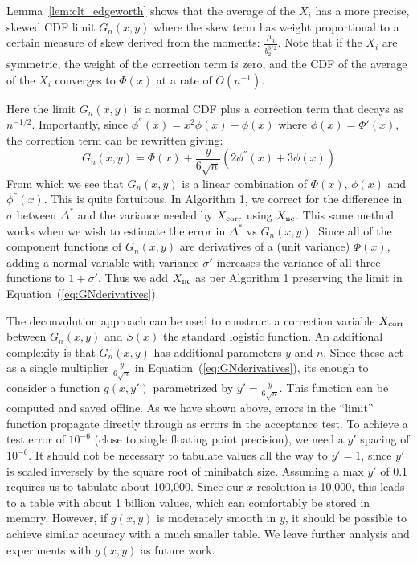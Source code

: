 \documentclass[twoside]{article} \usepackage{aistats2017}
\begin{document}
Lemma~\ref{lem:clt_edgeworth} shows that the average of the $X_i$ has a more
precise, skewed CDF limit $G_n(x,y)$ where the skew term has weight proportional
to a certain measure of skew derived from the moments:
$\frac{\mu_3}{b_2^{3/2}}$. Note that if the $X_i$ are symmetric, the weight of
the correction term is zero, and the CDF of the average of the $X_i$ converges
to $\Phi(x)$ at a rate of $O(n^{-1})$.

Here the limit $G_n(x,y)$ is a normal CDF plus a correction term that decays as
$n^{-1/2}$.
Importantly, since $\phi^{''}(x) = x^2\phi(x) - \phi(x)$ where
$\phi(x)=\Phi'(x)$, the correction term can be rewritten giving:
\begin{equation}\label{eq:GNderivatives}
    G_n(x,y) = \Phi(x) + \frac{y}{6\sqrt{n}}(2\phi^{''}(x)+3\phi(x))
\end{equation}
From which we see that $G_n(x,y)$ is a linear combination of $\Phi(x)$,
$\phi(x)$ and $\phi^{''}(x)$. This is quite fortuitous. In Algorithm 1, we
correct for the difference in $\sigma$ between $\Delta^*$ and the variance
needed by $X_{\rm corr}$ using $X_{\rm nc}$. This same method works when we
wish to estimate the error in $\Delta^*$ vs $G_n(x,y)$. Since all of the
component functions of $G_n(x,y)$ are derivatives of a (unit variance)
$\Phi(x)$, adding a normal variable with variance $\sigma'$ increases the
variance of all three functions to $1+\sigma'$. Thus we add $X_{\rm nc}$ as
per Algorithm 1 preserving the limit in Equation~(\ref{eq:GNderivatives}).

The deconvolution approach can be used to construct a correction variable
$X_{\rm corr}$ between $G_n(x,y)$ and $S(x)$ the standard logistic function. An
additional complexity is that $G_n(x,y)$ has additional parameters $y$ and $n$.
Since these act as a single multiplier $\frac{y}{6\sqrt{n}}$ in
Equation~(\ref{eq:GNderivatives}), its enough to consider a function $g(x,y')$
parametrized by $y'= \frac{y}{6\sqrt{n}}$. This function can be computed and
saved offline. As we have shown above, errors in the ``limit'' function
propagate directly through as errors in the acceptance test.  To achieve a test
error of $10^{-6}$ (close to single floating point precision), we need a $y'$
spacing of $10^{-6}$. It should not be necessary to tabulate values all the way to
$y'=1$, since $y'$ is scaled inversely by the square root of minibatch size.
Assuming a max $y'$ of 0.1 requires us to tabulate about 100,000.  Since our $x$
resolution is 10,000, this leads to a table with about 1 billion values, which
can comfortably be stored in memory.  However, if $g(x,y)$ is moderately smooth
in $y$, it should be possible to achieve similar accuracy with a much smaller
table. We leave further analysis and experiments with $g(x,y)$ as future work.
\end{document}
